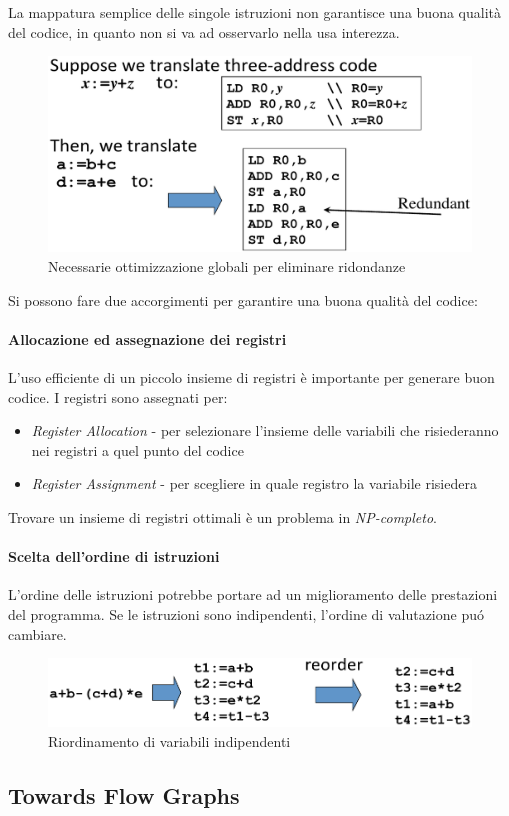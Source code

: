 La mappatura semplice delle singole istruzioni non garantisce una buona
qualit\`a del codice, in quanto non si va ad osservarlo nella usa interezza.

\begin{figure}[H]
  \centering
  \includegraphics[scale=0.35]{res/image/needed_global_optimization}
  \caption{Necessarie ottimizzazione globali per eliminare ridondanze}
  \label{img:needed_global_optimization}
\end{figure}

Si possono fare due accorgimenti per garantire una buona qualit\`a del codice:
\paragraph{Allocazione ed assegnazione dei registri}
L'uso efficiente di un piccolo insieme di registri \`e importante per generare
buon codice. I registri sono assegnati per:
\begin{itemize}
\item \textit{Register Allocation} - per selezionare l'insieme delle variabili
che risiederanno nei registri a quel punto del codice
\item \textit{Register Assignment} - per scegliere in quale registro la
variabile risiedera
\end{itemize}
Trovare un insieme di registri ottimali \`e un problema in
\textit{NP-completo}.
\paragraph{Scelta dell'ordine di istruzioni}
L'ordine delle istruzioni potrebbe portare ad un miglioramento delle
prestazioni del programma. Se le istruzioni sono indipendenti, l'ordine di
valutazione pu\'o cambiare.

\begin{figure}[H]
  \centering
  \includegraphics[scale=0.5]{res/image/reorder_variable}
  \caption{Riordinamento di variabili indipendenti}
  \label{img:reorder_variable}
\end{figure}

\subsection{Towards Flow Graphs}

